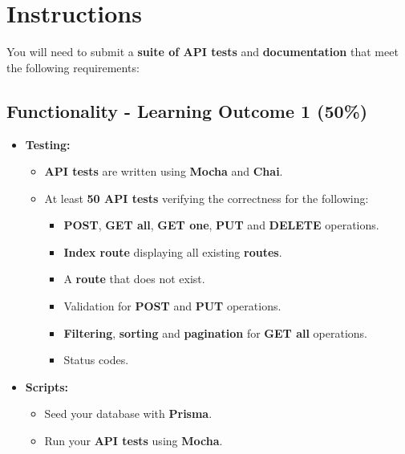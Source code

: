 \documentclass{article}
\begin{document}
\section*{Instructions}
You will need to submit a \textbf{suite of API tests} and \textbf{documentation} that meet the following requirements:

\subsection*{Functionality - Learning Outcome 1 (50\%)}
\begin{itemize}
  \item \textbf{Testing:}
	\begin{itemize}
    \item \textbf{API tests} are written using \textbf{Mocha} and \textbf{Chai}.
    \item At least \textbf{50 API tests} verifying the correctness for the following:
          \begin{itemize}
            \item \textbf{POST}, \textbf{GET all}, \textbf{GET one}, \textbf{PUT} and \textbf{DELETE} operations.
            \item \textbf{Index route} displaying all existing \textbf{routes}.
            \item A \textbf{route} that does not exist.
            \item Validation for \textbf{POST} and \textbf{PUT} operations.
            \item \textbf{Filtering}, \textbf{sorting} and \textbf{pagination} for \textbf{GET all} operations.
            \item Status codes.
          \end{itemize}
	\end{itemize}
	\item \textbf{Scripts:}
	\begin{itemize}
    \item Seed your database with \textbf{Prisma}.
		\item Run your \textbf{API tests} using \textbf{Mocha}.
	\end{itemize}
\end{itemize}
\end{document}

